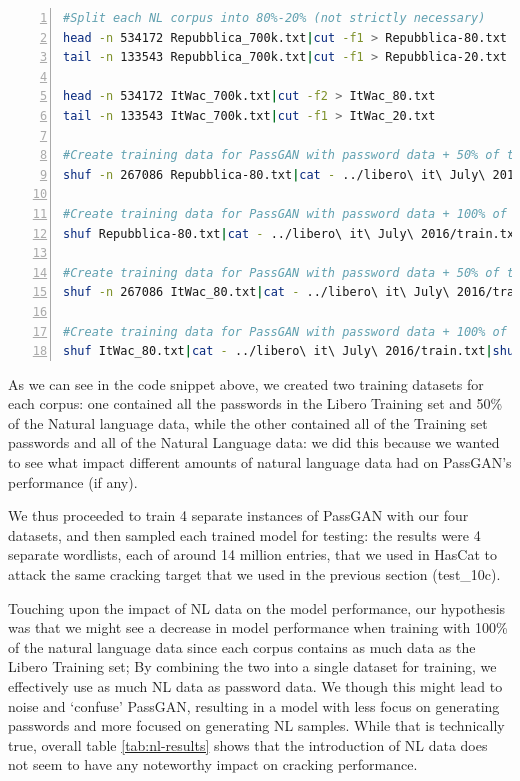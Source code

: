 \begin{lstlisting}[language=bash,numbers=left,stepnumber=1,breaklines=true,postbreak=\mbox{\textcolor{red}{$\hookrightarrow$}\space}]
#Split each NL corpus into 80%-20% (not strictly necessary)
head -n 534172 Repubblica_700k.txt|cut -f1 > Repubblica-80.txt
tail -n 133543 Repubblica_700k.txt|cut -f1 > Repubblica-20.txt

head -n 534172 ItWac_700k.txt|cut -f2 > ItWac_80.txt
tail -n 133543 ItWac_700k.txt|cut -f1 > ItWac_20.txt

#Create training data for PassGAN with password data + 50% of the Repubblica corpus
shuf -n 267086 Repubblica-80.txt|cat - ../libero\ it\ July\ 2016/train.txt|shuf > libero+Repubblica-50.txt

#Create training data for PassGAN with password data + 100% of the repubblica corpus
shuf Repubblica-80.txt|cat - ../libero\ it\ July\ 2016/train.txt|shuf > libero+Repubblica.txt

#Create training data for PassGAN with password data + 50% of the ItWaC corpus
shuf -n 267086 ItWac_80.txt|cat - ../libero\ it\ July\ 2016/train.txt|shuf > libero+ItWac-50.txt

#Create training data for PassGAN with password data + 100% of the ItwaC corpus
shuf ItWac_80.txt|cat - ../libero\ it\ July\ 2016/train.txt|shuf > libero+ItWac.txt
\end{lstlisting}

As we can see in the code snippet above, we created two training datasets for each corpus: one contained all the passwords in the Libero Training set and 50\% of the Natural language data, while the other contained all of the Training set passwords and all of the Natural Language data: we did this because we wanted to see what impact different amounts of natural language data had on PassGAN's performance (if any).

We thus proceeded to train 4 separate instances of PassGAN with our four datasets, and then sampled each trained model for testing: the results were 4 separate wordlists, each of around 14 million entries, that we used in HasCat to attack the same cracking target that we used in the previous section (test\_10c).

Touching upon the impact of NL data on the model performance, our hypothesis was that we might see a decrease in model performance when training with 100\% of the natural language data since each corpus contains as much data as the Libero Training set; By combining the two into a single dataset for training, we effectively use as much NL data as password data.  We though this might lead to noise and ‘confuse’ PassGAN, resulting in a model with less focus on generating passwords and more focused on generating NL samples. While that is technically true, overall table \ref{tab:nl-results} shows that the introduction of NL data does not seem to have any noteworthy impact on cracking performance.

